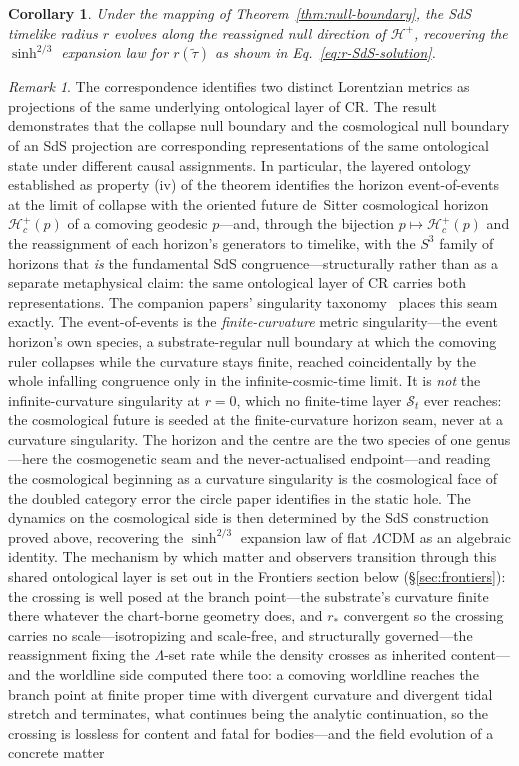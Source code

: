\documentclass[11pt,a4paper]{article}
\theoremstyle{plain}
\newtheorem{corollary}{Corollary}
\theoremstyle{definition}
\theoremstyle{remark}
\newtheorem{remark}{Remark}
\begin{document}
\begin{corollary}
Under the mapping of Theorem~\ref{thm:null-boundary}, the SdS timelike radius $r$ evolves along the reassigned null direction of $\mathcal{H}^+$, recovering the $\sinh^{2/3}$ expansion law for $r(\tilde{\tau})$ as shown in Eq.~\eqref{eq:r-SdS-solution}.
\end{corollary}

\begin{remark}
The correspondence identifies two distinct Lorentzian metrics as projections of the same underlying ontological layer of CR. The result demonstrates that the collapse null boundary and the cosmological null boundary of an SdS projection are corresponding representations of the same ontological state under different causal assignments. In particular, the layered ontology established as property (iv) of the theorem identifies the horizon event-of-events at the limit of collapse with the oriented future de~Sitter cosmological horizon $\mathcal{H}_c^{+}(p)$ of a comoving geodesic $p$---and, through the bijection $p\mapsto\mathcal{H}_c^{+}(p)$ and the reassignment of each horizon's generators to timelike, with the $S^3$ family of horizons that \emph{is} the fundamental SdS congruence---structurally rather than as a separate metaphysical claim: the same ontological layer of CR carries both representations. The companion papers' singularity taxonomy~\cite{JanzenBHcausality,JanzenCircle} places this seam exactly. The event-of-events is the \emph{finite-curvature} metric singularity---the event horizon's own species, a substrate-regular null boundary at which the comoving ruler collapses while the curvature stays finite, reached coincidentally by the whole infalling congruence only in the infinite-cosmic-time limit. It is \emph{not} the infinite-curvature singularity at $r=0$, which no finite-time layer $\mathcal{S}_t$ ever reaches: the cosmological future is seeded at the finite-curvature horizon seam, never at a curvature singularity. The horizon and the centre are the two species of one genus---here the cosmogenetic seam and the never-actualised endpoint---and reading the cosmological beginning as a curvature singularity is the cosmological face of the doubled category error the circle paper identifies in the static hole. The dynamics on the cosmological side is then determined by the SdS construction proved above, recovering the $\sinh^{2/3}$ expansion law of flat $\Lambda$CDM as an algebraic identity. The mechanism by which matter and observers transition through this shared ontological layer is set out in the Frontiers section below (\S\ref{sec:frontiers}): the crossing is well posed at the branch point---the substrate's curvature finite there whatever the chart-borne geometry does, and $r_*$ convergent so the crossing carries no scale---isotropizing and scale-free, and structurally governed---the reassignment fixing the $\Lambda$-set rate while the density crosses as inherited content---and the worldline side computed there too: a comoving worldline reaches the branch point at finite proper time with divergent curvature and divergent tidal stretch and terminates, what continues being the analytic continuation, so the crossing is lossless for content and fatal for bodies---and the field evolution of a concrete matter 
\end{remark}
\end{document}
